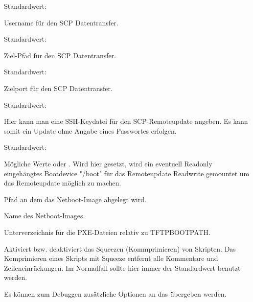 \begin{description}

  Standardwert: 

  Username für den SCP Datentransfer.


  Standardwert: 

  Ziel-Pfad für den SCP Datentransfer.


  Standardwert: 

  Zielport für den SCP Datentransfer.


  Standardwert: 

  Hier kann man eine SSH-Keydatei für den SCP-Remoteupdate angeben.
  Es kann somit ein Update ohne Angabe eines Passwortes erfolgen.
  
  
  Standardwert: 
  
  Mögliche Werte  oder . Wird hier 
  gesetzt, wird ein eventuell Readonly eingehängtes Bootdevice "/boot"
  für das Remoteupdate Readwrite gemountet um das Remoteupdate möglich
  zu machen. 


  Pfad an dem das Netboot-Image abgelegt wird.


  Name des Netboot-Images.


  Unterverzeichnis für die PXE-Dateien relativ zu TFTPBOOTPATH.



   Aktiviert bzw. deaktiviert das Squeezen (Kommprimieren) von
   Skripten.
   Das Komprimieren eines Skripts mit Squeeze entfernt alle Kommentare und
   Zeileneinrückungen.
   Im Normalfall sollte hier immer der Standardwert  benutzt werden.


   Es können zum Debuggen zusätzliche Optionen an das  übergeben
   werden.

  \end{description}

